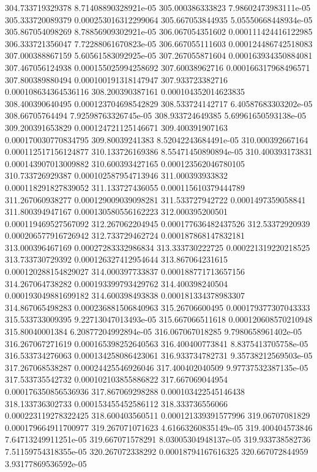 {304.733719329378 8.71408890328921e-05
305.000386333823 7.98602473983111e-05
305.333720089379 0.000253016312299064
305.667053844935 5.05550668448934e-05
305.867054098269 8.78856909302921e-05
306.067054351602 0.000111424416122985
306.333721356047 7.72288061670823e-05
306.667055111603 0.000124486742518083
307.000388867159 5.60561583092925e-05
307.267055871604 0.000163934350884081
307.467056124938 0.000155025994258692
307.60038962716 0.000166317968496571
307.800389880494 0.000100191318147947
307.933723382716 0.000108634364536116
308.200390387161 0.000104352014623835
308.400390640495 0.000123704698542829
308.533724142717 6.40587683303202e-05
308.66705764494 7.92598763326745e-05
308.933724649385 5.69961650593138e-05
309.200391653829 0.000124721125146671
309.400391907163 0.000170030770834795
309.80039241383 8.52042243684491e-05
310.000392667164 0.000112517156124877
310.133726169386 8.55471450890894e-05
310.400393173831 0.000143907013009882
310.600393427165 0.000123562046780105
310.733726929387 0.000102587954713946
311.000393933832 0.000118291827839052
311.133727436055 0.000115610379444789
311.267060938277 0.000129009039098281
311.533727942722 0.0001497359058841
311.800394947167 0.000130580556162223
312.000395200501 0.000119469527567092
312.267062204945 0.000177636482437526
312.53372920939 0.000206577916726942
312.733729462724 0.000187868147832181
313.000396467169 0.00027283332986834
313.333730222725 0.000221319220218525
313.733730729392 0.000126327412954644
313.867064231615 0.000120288154829027
314.000397733837 0.000188771713657156
314.267064738282 0.000193399793429762
314.400398240504 0.000193049881699182
314.600398493838 0.000181334378983307
314.867065498283 0.000236881506840963
315.26706600495 0.000179377307043333
315.533733009395 9.22713047013493e-05
315.667066511618 0.000120608570210948
315.80040001384 6.20877204992894e-05
316.067067018285 9.7980658961402e-05
316.267067271619 0.000165398252640563
316.400400773841 8.8375413705758e-05
316.533734276063 0.000134258086423061
316.933734782731 9.35738212569503e-05
317.267068538287 0.00024425546926046
317.400402040509 9.97737532387135e-05
317.533735542732 0.000102103855886822
317.667069044954 0.000176350856536936
317.867069298288 0.000103422545146438
318.133736302733 0.000153455452586112
318.333736556066 0.000223119278322425
318.600403560511 0.000121339391577996
319.06707081829 0.000179664911700977
319.267071071623 4.61663260835149e-05
319.400404573846 7.64713249911251e-05
319.667071578291 8.03005304948137e-05
319.933738582736 7.51159754318355e-05
320.267072338292 0.00018794167616325
320.667072844959 3.93177869536592e-05
}
